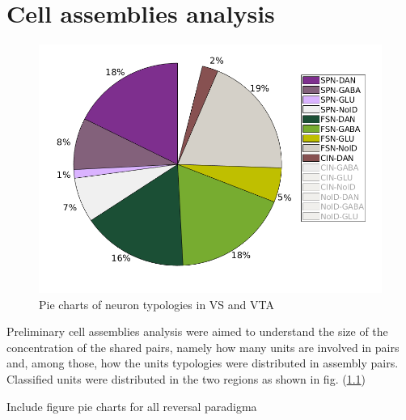 \chapter{Cell assemblies analysis}
\label{chap:AssemblyAnalysis}
\begin{figure}
    \centering
    \includegraphics[scale=0.65]{figures/PieAssemblies1.png}
    \caption{Pie charts of neuron typologies in VS and VTA }
    \label{fig:GlobalPie}
\end{figure}
Preliminary cell assemblies analysis were aimed to understand the size of the concentration of the shared pairs, namely how many units are involved in pairs and, among those, how the units typologies were distributed in assembly pairs. Classified units were distributed in the two regions as shown in fig. (\ref{fig:GlobalPie})

{\color{red} Include figure pie charts for all reversal paradigma}
